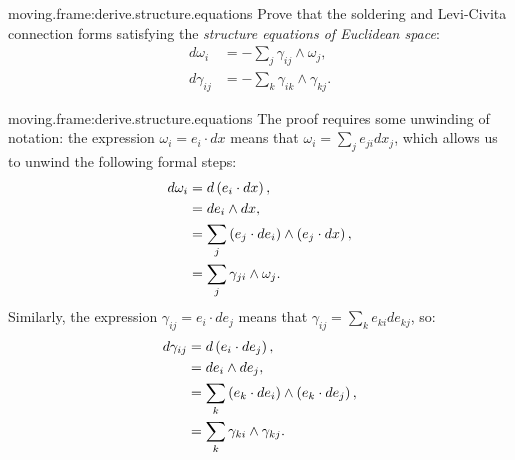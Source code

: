 \begin{problem}{moving.frame:derive.structure.equations}
Prove that the soldering and Levi-Civita connection forms satisfying the \emph{structure equations of Euclidean space}:
\begin{align*}
d \omega_i &= - \sum_j \gamma_{ij} \wedge \omega_j, \\
d \gamma_{ij} &= -\sum_k \gamma_{ik} \wedge \gamma_{kj}.
\end{align*}
\end{problem}
\begin{answer}{moving.frame:derive.structure.equations}
The proof requires some unwinding of notation: the expression \(\omega_i=e_i \cdot dx\) means that \(\omega_i = \sum_j e_{ji} dx_j\), which allows us to unwind the following formal steps:
\begin{align*}
d\omega_i &= d\left(e_i \cdot dx\right),\\
&= de_i \wedge dx, \\
&= \sum_j \left(e_j \cdot de_i\right) \wedge \left(e_j \cdot dx\right), \\
&= \sum_j \gamma_{ji} \wedge \omega_j.
\end{align*}
Similarly, the expression \(\gamma_{ij}=e_i \cdot de_j\) means that \(\gamma_{ij} = \sum_k e_{ki} de_{kj}\), so:
\begin{align*}
d\gamma_{ij} &= d\left(e_i \cdot de_j\right), \\
&= de_i \wedge de_j, \\
&= \sum_k \left(e_k \cdot de_i\right) \wedge \left(e_k \cdot de_j\right), \\
&= \sum_k \gamma_{ki} \wedge \gamma_{kj}.
\end{align*}
\end{answer}

